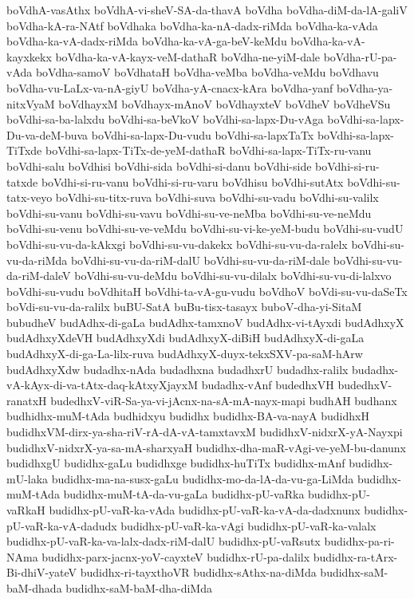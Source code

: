 {boVdhA-vasAthx
boVdhA-vi-sheV-SA-da-thavA
boVdha
boVdha-diM-da-lA-galiV
boVdha-kA-ra-NAtf
boVdhaka
boVdha-ka-nA-dadx-riMda
boVdha-ka-vAda
boVdha-ka-vA-dadx-riMda
boVdha-ka-vA-ga-beV-keMdu
boVdha-ka-vA-kayxkekx
boVdha-ka-vA-kayx-veM-dathaR
boVdha-ne-yiM-dale
boVdha-rU-pa-vAda
boVdha-samoV
boVdhataH
boVdha-veMba
boVdha-veMdu
boVdhavu
boVdha-vu-LaLx-va-nA-giyU
boVdha-yA-cnacx-kAra
boVdha-yanf
boVdha-ya-nitxVyaM
boVdhayxM
boVdhayx-mAnoV
boVdhayxteV
boVdheV
boVdheVSu
boVdhi-sa-ba-lalxdu
boVdhi-sa-beVkoV
boVdhi-sa-lapx-Du-vAga
boVdhi-sa-lapx-Du-va-deM-buva
boVdhi-sa-lapx-Du-vudu
boVdhi-sa-lapxTaTx
boVdhi-sa-lapx-TiTxde
boVdhi-sa-lapx-TiTx-de-yeM-dathaR
boVdhi-sa-lapx-TiTx-ru-vanu
boVdhi-salu
boVdhisi
boVdhi-sida
boVdhi-si-danu
boVdhi-side
boVdhi-si-ru-tatxde
boVdhi-si-ru-vanu
boVdhi-si-ru-varu
boVdhisu
boVdhi-sutAtx
boVdhi-su-tatx-veyo
boVdhi-su-titx-ruva
boVdhi-suva
boVdhi-su-vadu
boVdhi-su-valilx
boVdhi-su-vanu
boVdhi-su-vavu
boVdhi-su-ve-neMba
boVdhi-su-ve-neMdu
boVdhi-su-venu
boVdhi-su-ve-veMdu
boVdhi-su-vi-ke-yeM-budu
boVdhi-su-vudU
boVdhi-su-vu-da-kAkxgi
boVdhi-su-vu-dakekx
boVdhi-su-vu-da-ralelx
boVdhi-su-vu-da-riMda
boVdhi-su-vu-da-riM-dalU
boVdhi-su-vu-da-riM-dale
boVdhi-su-vu-da-riM-daleV
boVdhi-su-vu-deMdu
boVdhi-su-vu-dilalx
boVdhi-su-vu-di-lalxvo
boVdhi-su-vudu
boVdhitaH
boVdhi-ta-vA-gu-vudu
boVdhoV
boVdi-su-vu-daSeTx
boVdi-su-vu-da-ralilx
buBU-SatA
buBu-tisx-tasayx
buboV-dha-yi-SitaM
bubudheV
budAdhx-di-gaLa
budAdhx-tamxnoV
budAdhx-vi-tAyxdi
budAdhxyX
budAdhxyXdeVH
budAdhxyXdi
budAdhxyX-diBiH
budAdhxyX-di-gaLa
budAdhxyX-di-ga-La-lilx-ruva
budAdhxyX-duyx-tekxSXV-pa-saM-hArw
budAdhxyXdw
budadhx-nAda
budadhxna
budadhxrU
budadhx-ralilx
budadhx-vA-kAyx-di-va-tAtx-daq-kAtxyXjayxM
budadhx-vAnf
budedhxVH
budedhxV-ranatxH
budedhxV-viR-Sa-ya-vi-jAcnx-na-sA-mA-nayx-mapi
budhAH
budhanx
budhidhx-muM-tAda
budhidxyu
budidhx
budidhx-BA-va-nayA
budidhxH
budidhxVM-dirx-ya-sha-riV-rA-dA-vA-tamxtavxM
budidhxV-nidxrX-yA-Nayxpi
budidhxV-nidxrX-ya-sa-mA-sharxyaH
budidhx-dha-maR-vAgi-ve-yeM-bu-danunx
budidhxgU
budidhx-gaLu
budidhxge
budidhx-huTiTx
budidhx-mAnf
budidhx-mU-laka
budidhx-ma-na-susx-gaLu
budidhx-mo-da-lA-da-vu-ga-LiMda
budidhx-muM-tAda
budidhx-muM-tA-da-vu-gaLa
budidhx-pU-vaRka
budidhx-pU-vaRkaH
budidhx-pU-vaR-ka-vAda
budidhx-pU-vaR-ka-vA-da-dadxnunx
budidhx-pU-vaR-ka-vA-dadudx
budidhx-pU-vaR-ka-vAgi
budidhx-pU-vaR-ka-valalx
budidhx-pU-vaR-ka-va-lalx-dadx-riM-dalU
budidhx-pU-vaRsutx
budidhx-pa-ri-NAma
budidhx-parx-jacnx-yoV-cayxteV
budidhx-rU-pa-dalilx
budidhx-ra-tArx-Bi-dhiV-yateV
budidhx-ri-tayxthoVR
budidhx-sAthx-na-diMda
budidhx-saM-baM-dhada
budidhx-saM-baM-dha-diMda
}
